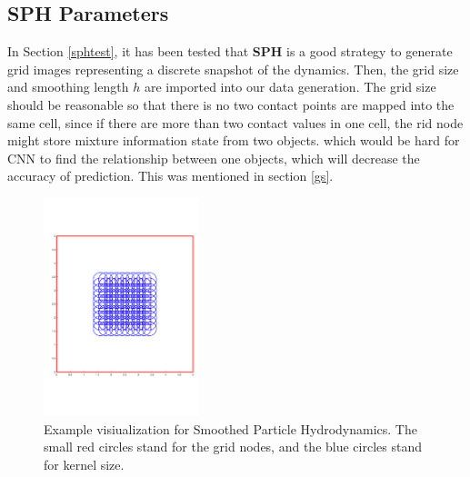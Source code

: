 \subsection{SPH Parameters}
    \label{SPH-setting}
    In Section \ref{sphtest}, it has been tested that \textbf{SPH} is a good strategy to generate grid images representing a discrete snapshot of the dynamics. Then, the grid size and smoothing length $h$ are imported into our data generation. The grid size should be reasonable so that there is no two contact points are mapped into the same cell, since if there are more than two contact values in one cell, the rid node might store mixture information state from two objects. which would be hard for CNN to find the relationship between one objects, which will decrease the accuracy of prediction. This was mentioned in section \ref{gs}.
    \begin{figure}[!h]
        \centering
        \includegraphics[width=0.4\textwidth]{Figures/SPHvi.pdf}
        \caption{Example visiualization for Smoothed Particle Hydrodynamics. The small red circles stand for the grid nodes, and the blue circles stand for kernel size.}
    \end{figure}


